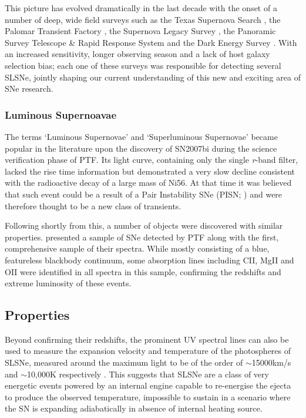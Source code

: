 This picture has evolved dramatically in the last decade with the onset of a number of deep, wide field surveys such as the Texas Supernova Search \citep[TSS;][]{Quimby2006}, the Palomar Transient Factory \citep[PTF;][]{Law2009, Rau2009}, the Supernova Legacy Survey \citep[SNLS;][]{Astier2005,Guy2010,Perrett2010}, the Panoramic Survey Telescope \& Rapid Response System \citep[Pan-STARRS;][]{Kaiser2010} and the Dark Energy Survey \citep[DES;][]{Flaugher2005}. With an increased sensitivity, longer observing season and a lack of host galaxy selection bias; each one of these surveys was responsible for detecting several SLSNe, jointly shaping our current understanding of this new and exciting area of SNe research.

\subsubsection{Luminous Supernoavae}
The terms `Luminous Supernovae' and `Superluminous Supernovae' became popular in the literature upon the discovery of SN2007bi \citep{Gal-Yam2009} during the science verification phase of PTF. Its light curve, containing only the single \textit{r}-band filter, lacked the rise time information but demonstrated a very slow decline consistent with the radioactive decay of a large mass of Ni56. At that time it was believed that such event could be a result of a Pair Instability SNe (PISN; ) and were therefore thought to be a new class of transients.

Following shortly from this, a number of objects were discovered with similar properties. \citet{Quimby2009} presented a sample of SNe detected by PTF along with the first, comprehensive sample of their spectra. While mostly consisting of a blue, featureless blackbody continuum, some absorption lines including CII, MgII and OII \citep[see ][for more recent line identification]{Mazzali2015} were identified in all spectra in this sample, confirming the redshifts and extreme luminosity of these events.

\subsection{Properties}
Beyond confirming their redshifts, the prominent UV spectral lines can also be used to measure the expansion velocity and temperature of the photospheres of SLSNe, measured around the maximum light to be of the order of $\sim$15000km/s and $\sim$10,000K respectively \citep{Inserra2013}. This suggests that SLSNe are a class of very energetic events powered by an internal engine capable to re-energise the ejecta to produce the observed temperature, impossible to sustain in a scenario where the SN is expanding adiabatically in absence of internal heating source.

